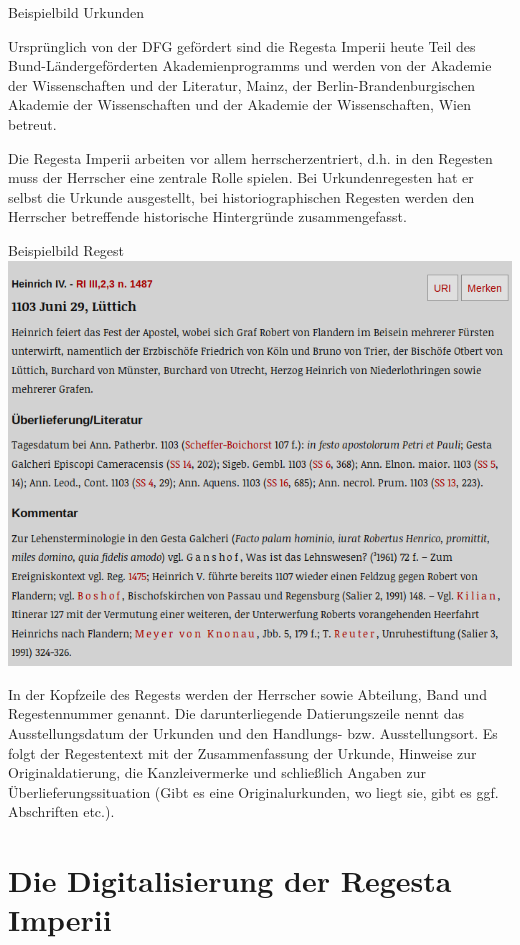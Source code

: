 \documentclass[ngerman,]{scrreprt}
\begin{document}
Beispielbild Urkunden

Ursprünglich von der DFG gefördert sind die Regesta Imperii heute Teil des Bund-Ländergeförderten Akademienprogramms und werden von der Akademie der Wissenschaften und der Literatur, Mainz, der Berlin-Brandenburgischen Akademie der Wissenschaften und der Akademie der Wissenschaften, Wien betreut.

Die Regesta Imperii arbeiten vor allem herrscherzentriert, d.h. in den Regesten muss der Herrscher eine zentrale Rolle spielen. Bei Urkundenregesten hat er selbst die Urkunde ausgestellt, bei historiographischen Regesten werden den Herrscher betreffende historische Hintergründe zusammengefasst.

Beispielbild Regest \includegraphics{Bilder/RI2Graph/ReggH4-Nr-1487.png}

In der Kopfzeile des Regests werden der Herrscher sowie Abteilung, Band und Regestennummer genannt. Die darunterliegende Datierungszeile nennt das Ausstellungsdatum der Urkunden und den Handlungs- bzw. Ausstellungsort. Es folgt der Regestentext mit der Zusammenfassung der Urkunde, Hinweise zur Originaldatierung, die Kanzleivermerke und schließlich Angaben zur Überlieferungssituation (Gibt es eine Originalurkunden, wo liegt sie, gibt es ggf. Abschriften etc.).

\section{Die Digitalisierung der Regesta Imperii}\label{die-digitalisierung-der-regesta-imperii}
\end{document}
